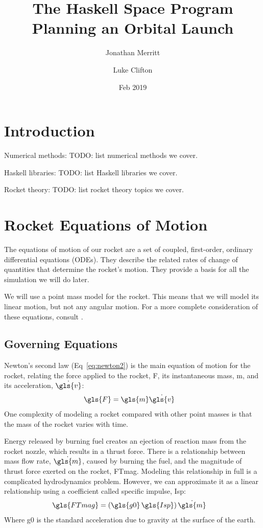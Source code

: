 \documentclass[12pt,openany]{book}
\title{
  The Haskell Space Program\\
  Planning an Orbital Launch
}
\author{
  Jonathan Merritt
  \and
  Luke Clifton
}
\date{Feb 2019}
\begin{document}
\maketitle
\tableofcontents

\chapter{Introduction}

Numerical methods: TODO: list numerical methods we cover.

Haskell libraries: TODO: list Haskell libraries we cover.

Rocket theory: TODO: list rocket theory topics we cover.

\chapter{Rocket Equations of Motion}
\label{ch:rocket-eom}

The equations of motion of our rocket are a set of coupled, first-order, ordinary differential equations (ODEs). They describe the related rates of change of quantities that determine the rocket's motion. They provide a basis for all the simulation we will do later.

We will use a point mass model for the rocket. This means that we will model its linear motion, but not any angular motion. For a more complete consideration of these equations, consult \cite{gantmacher1950}.

\section{Governing Equations}

Newton's second law (Eq~\ref{eq:newton2}) is the main equation of motion for the rocket, relating the force applied to the rocket, \gls{F}, its instantaneous mass, \gls{m}, and its acceleration, $\dot{\gls{v}}$:
\begin{align}
  \gls{F} &= \gls{m} \dot{\gls{v}}  \label{eq:newton2}
\end{align}
One complexity of modeling a rocket compared with other point masses is that the mass of the rocket varies with time.

Energy released by burning fuel creates an ejection of reaction mass from the rocket nozzle, which results in a thrust force. There is a relationship between mass flow rate, $\dot{\gls{m}}$, caused by burning the fuel, and the magnitude of thrust force exerted on the rocket, \gls{FTmag}. Modeling this relationship in full is a complicated hydrodynamics problem. However, we can approximate it as a linear relationship using a coefficient called specific impulse, \gls{Isp}:
\begin{align}
  \gls{FTmag} &= \left( \gls{g0} \, \gls{Isp} \right) \dot{\gls{m}}
\end{align}
Where \gls{g0} is the standard acceleration due to gravity at the surface of the earth.
\end{document}

